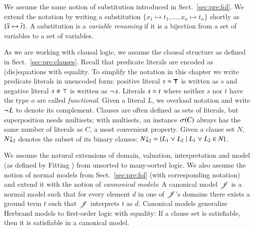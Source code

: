 We assume the same notion of substitution introduced in Sect.~\ref{sec:pre:fol}.
We extend the notation by writing a substitution $\{x_1 \mapsto t_1,
\ldots,\allowbreak x_n \mapsto t_n\}$ shortly as $\{ \overline{x}_{} \mapsto \overline{t}_{} \}$.
A substitution is a \emph{variable renaming} if it is a
bijection from a set of variables to a set of variables.


As we are working with clausal logic, we assume the clausal structure as defined
in Sect.~\ref{sec:pre:clauses}. Recall that predicate literals  are encoded
as (dis)equations with equality. To simplify the notation in this chapter we write
predicate literals in unencoded form: positive literal $s \approx \pmb{\top}$ is written
as $s$ and negative literal $\neqlit{s}{\top}$ is written as $\neg{\kern.2ex s}$.
Literals $s \approx t$ where neither $s$ nor $t$ have the type $o$ are called \emph{functional}.
Given a literal $L$, we overload notation and write $\neg{\kern.2ex L}$ to
denote its complement. Clauses are often defined
as sets of literals, but superposition needs multisets; with multisets,
an instance $\sigma(C)$ always has the same number of literals as $C$, a most
convenient property. Given a clause set $N$, $N{\downarrow}_2$ denotes the subset of
its binary clauses: $N{\downarrow}_2 = \{ L_1 \mathrel{\lor} L_2 \mid L_1 \mathrel{\lor} L_2 \in N \}$.

We assume the natural extensions of domain, valuation, interpretation and model
(as defined by Fitting \cite{mf-1996-fol}) from unsorted to many-sorted logic.
We also assume the notion of normal models from Sect.~\ref{sec:pre:fol} (with
corresponding notation) and extend it with the notion of \emph{cannonical
models}: A canonical model $\mathscr{J}$ is a normal model such that for every
element $d$ in one of $\mathscr{J}$'s domains there exists a ground term $t$ such
that $\mathscr{J}$ interprets $t$ as $d$. Canonical models generalize Herbrand
models \cite{mf-1996-fol} to first-order logic with equality: If a clause set is satisfiable, then
it is satisfiable in a canonical model.

%


